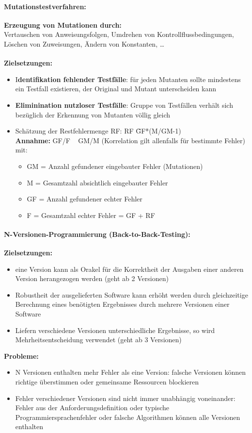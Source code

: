 \paragraph{Mutationstestverfahren:}

\textbf{Erzeugung von Mutationen durch:} \\
Vertauschen von Anweisungsfolgen, Umdrehen von Kontrollflussbedingungen, Löschen von Zuweisungen, Ändern von Konstanten, …
\\
\\
\textbf{Zielsetzungen:}
\begin{itemize}
	\item I\textbf{dentifikation fehlender Testfälle}: für jeden Mutanten sollte mindestens ein Testfall existieren, der Original und Mutant unterscheiden kann
	\item \textbf{Eliminination nutzloser Testfälle}: Gruppe von Testfällen verhält sich bezüglich der Erkennung von Mutanten völlig gleich
	\item Schätzung der Restfehlermenge RF: RF \~ GF*(M/GM-1) \\
	\textbf{Annahme:}  GF/F ~ GM/M (Korrelation gilt allenfalls für bestimmte Fehler) \\
	mit:
	\begin{itemize}
		\item GM = Anzahl gefundener eingebauter Fehler (Mutationen)
		\item M  = Gesamtzahl absichtlich eingebauter Fehler
		\item GF  = Anzahl gefundener echter Fehler
		\item F = Gesamtzahl echter Fehler = GF + RF
	\end{itemize}
\end{itemize}

\paragraph{N-Versionen-Programmierung (Back-to-Back-Testing):}

\textbf{Zielsetzungen:}
\begin{itemize}
	\item eine Version kann als Orakel für die Korrektheit der Ausgaben einer anderen Version herangezogen werden (geht ab 2 Versionen)
	\item Robustheit der ausgelieferten Software kann erhöht werden durch gleichzeitige Berechnung eines benötigten Ergebnisses durch mehrere Versionen einer Software
	\item Liefern verschiedene Versionen unterschiedliche Ergebnisse, so wird Mehrheitsentscheidung verwendet (geht ab 3 Versionen)
\end{itemize}
\textbf{Probleme:}
\begin{itemize}
	\item N Versionen enthalten mehr Fehler als eine Version: falsche Versionen können richtige überstimmen oder gemeinsame Ressourcen blockieren
	\item Fehler verschiedener Versionen sind nicht immer unabhängig voneinander: Fehler aus der Anforderungsdefinition oder typische Programmiersprachenfehler oder falsche Algorithmen können alle Versionen enthalten
\end{itemize}

